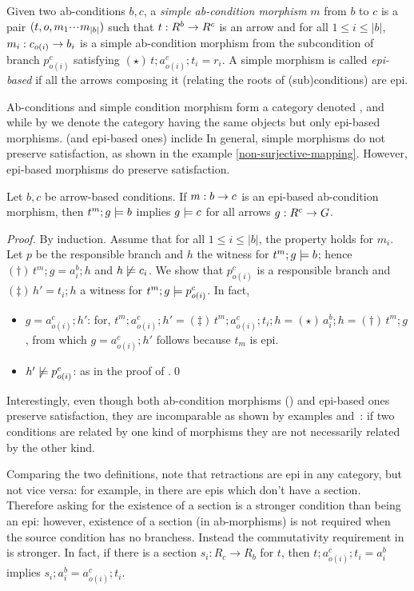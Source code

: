 \begin{definition}
  Given two ab-conditions $b,c$, a \emph{simple ab-condition morphism} $m$ from $b$ to $c$ is a pair $(t,o,m_1{\cdotp\mkern-2mu\cdotp\mkern-2mu\cdotp\mkern1mu} m_{|b|})$ such that $t:R^b\rightarrow R^c$ is an arrow and for all $1\leq i\leq |b|$, $m_i:c_{{o(i)}}\rightarrow b_i$ is a simple ab-condition morphism from the subcondition of branch $p^c_{o(i)}$ satisfying $(\star)\, t;a^c_{o(i)};t_i=r_i$. 
  A simple morphism is called \emph{epi-based} if all the arrows composing it (relating the roots of (sub)conditions) are epi. 
\end{definition}
%
Ab-conditions and simple condition morphism form a category denoted , and while by  we denote the category having the same objects but only epi-based morphisms.  (and epi-based ones) inclide
In general, simple morphisms do not preserve satisfaction, as shown in the example \ref{non-surjective-mapping}. However, epi-based morphisms do preserve satisfaction. 


\begin{proposition}
  Let $b,c$ be arrow-based conditions. If $m:b\rightarrow c$ is an epi-based ab-condition morphism, then $t^m;g\models b$ implies $g \models c$ for all arrows $g:R^c\rightarrow G$.
  \end{proposition}
  \emph{Proof.} By induction. Assume that for all $1\leq i\leq |b|$, the property holds for $m_i$. Let $p$ be the responsible branch and $h$ the witness for $t^m;g\models b$; hence $(\dagger)\, t^m;g=a^b_i;h$ and $h\not\models c_i$. We show that $p^c_{o(i)}$ is a responsible branch and $(\ddagger)\, h'=t_i;h$ a witness for $t^m;g\models p^c_{o(i)}$. In fact, 
  \begin{itemize}
  \item $g = a^c_{o(i)};h'$: for, $t^m;a^c_{o(i)};h' =\!(\ddagger)\, t^m;a^c_{o(i)};t_i;h =\!(\star)\, a^b_i; h =\!(\dagger)\, t^m;g$, from which  $g = a^c_{o(i)};h'$ follows because $t_m$ is epi. 
  \item $h'\not\models p^c_{o(i)}$: as in the proof of .\qed
  \end{itemize}
Interestingly, even though both ab-condition morphisms () and epi-based ones preserve satisfaction, they are incomparable as shown by examples  and~: if two conditions are related by one kind of morphisms they are not necessarily related by the other kind. 

Comparing the two definitions, note that retractions are epi in any category, but not vice versa: for example, in  there are epis which don't have a section. Therefore asking for the existence of a section is a stronger condition than being an epi: however, existence of a section (in ab-morphisms) is not required when the source condition has no branchess. Instead the commutativity requirement in  is stronger. In fact, if there is a section $s_i: R_c \to R_b$ for $t$, then  $t;a^c_{o(i)};t_i=a^b_i$ implies $s_i; a^b_i = a^c_{o(i)}; t_i$. 
